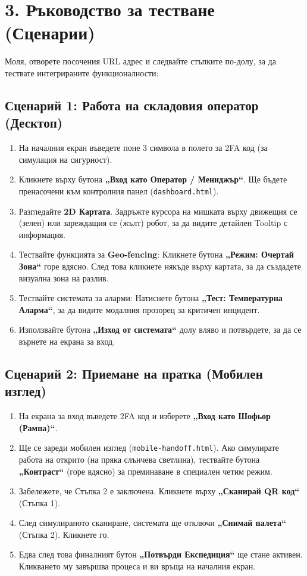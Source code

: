 \documentclass[12pt, a4paper]{article}
\begin{document}
\section*{3. Ръководство за тестване (Сценарии)}

Моля, отворете посочения URL адрес и следвайте стъпките по-долу, за да тествате интегрираните функционалности:

\subsection*{Сценарий 1: Работа на складовия оператор (Десктоп)}
\begin{enumerate}
    \item На началния екран въведете поне 3 символа в полето за 2FA код (за симулация на сигурност).
    \item Кликнете върху бутона \textbf{„Вход като Оператор / Мениджър“}. Ще бъдете пренасочени към контролния панел (\texttt{dashboard.html}).
    \item Разгледайте \textbf{2D Картата}. Задръжте курсора на мишката върху движещия се (зелен) или зареждащия се (жълт) робот, за да видите детайлен Tooltip с информация.
    \item Тествайте функцията за \textbf{Geo-fencing}: Кликнете бутона \textbf{„Режим: Очертай Зона“} горе вдясно. След това кликнете някъде върху картата, за да създадете визуална зона на разлив.
    \item Тествайте системата за аларми: Натиснете бутона \textbf{„Тест: Температурна Аларма“}, за да видите модалния прозорец за критичен инцидент.
    \item Използвайте бутона \textbf{„Изход от системата“} долу вляво и потвърдете, за да се върнете на екрана за вход.
\end{enumerate}

\subsection*{Сценарий 2: Приемане на пратка (Мобилен изглед)}
\begin{enumerate}
    \item На екрана за вход въведете 2FA код и изберете \textbf{„Вход като Шофьор (Рампа)“}.
    \item Ще се зареди мобилен изглед (\texttt{mobile-handoff.html}). Ако симулирате работа на открито (на пряка слънчева светлина), тествайте бутона \textbf{„Контраст“} (горе вдясно) за преминаване в специален четим режим.
    \item Забележете, че Стъпка 2 е заключена. Кликнете върху \textbf{„Сканирай QR код“} (Стъпка 1). 
    \item След симулираното сканиране, системата ще отключи \textbf{„Снимай палета“} (Стъпка 2). Кликнете го.
    \item Едва след това финалният бутон \textbf{„Потвърди Експедиция“} ще стане активен. Кликването му завършва процеса и ви връща на началния екран.
\end{enumerate}
\end{document}
